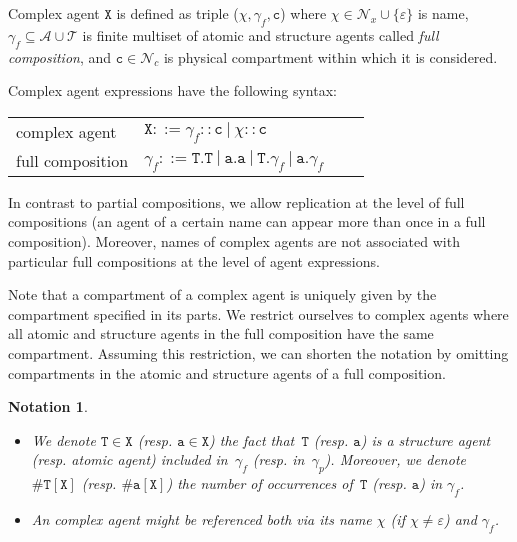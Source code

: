 \documentclass{entcs}
\renewcommand{\~}[0]{\texttildelow}
\newtheorem{notation}[thm]{Notation}
\begin{document}
\begin{definition}
Complex agent $\mathtt{X}$ is defined as triple ($\chi, \gamma_f, \mathtt{c}$) where $\chi \in \mathcal{N}_{x} \cup \{\varepsilon\}$ is name, $\gamma_f \subseteq \mathcal{A} \cup \mathcal{T}$ is finite multiset of atomic and structure agents called \emph{full composition}, and $\mathtt{c} \in \mathcal{N}_{c}$ is physical compartment within which it is considered.
\end{definition}

Complex agent expressions have the following syntax:

\begin{center}
{\small
\hspace*{-1 cm}\begin{tabular}{ ll ll }
 complex agent & $\mathtt{X}::=\gamma_f::\mathtt{c}~|~\chi::\mathtt{c}$\\
 full composition & $\gamma_f ::= \mathtt{T}.\mathtt{T}~|~\mathtt{a}.\mathtt{a}~|~\mathtt{T}.\gamma_{f}~|~\mathtt{a}.\gamma_{f}$
\end{tabular}
}
\end{center}

In contrast to partial compositions, we allow replication at the level of full compositions (an agent of a certain name can appear more than once in a full composition). Moreover, names of complex agents are not associated with particular full compositions at the level of agent expressions.

Note that a compartment of a complex agent is uniquely given by the compartment specified in its parts. We restrict ourselves to complex agents where all atomic and structure agents in the full composition have the same compartment. Assuming this restriction, we can shorten the notation by omitting compartments in the atomic and structure agents of a full composition. 

\begin{notation}
~
\begin{itemize}
\item  We denote $\mathtt{T}\in \mathtt{X}$ (resp. $\mathtt{a}\in \mathtt{X}$) the fact that~$\mathtt{T}$ (resp. $\mathtt{a}$) is a structure agent (resp. atomic agent) included in~$\gamma_f$ (resp. in~$\gamma_p$). 
Moreover, we denote $\#\mathtt{T}[\mathtt{X}]$ (resp. $\#\mathtt{a}[\mathtt{X}]$) the number of occurrences of~$\mathtt{T}$ (resp. $\mathtt{a}$) in $\gamma_f$. 
\item An complex agent might be referenced both via its name $\chi$ (if $\chi \neq \varepsilon$) and $\gamma_f$.
\end{itemize}
\end{notation}
\end{document}
